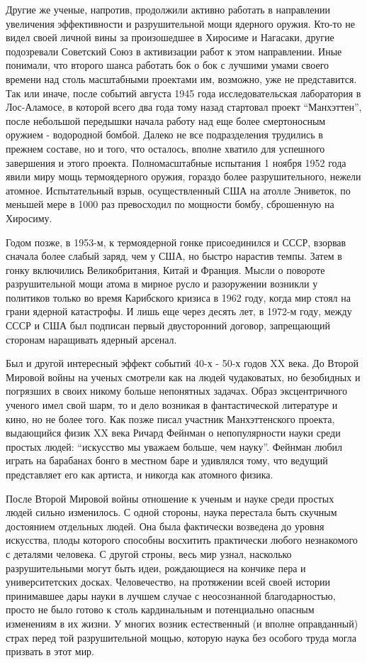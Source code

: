 Другие же ученые, напротив, продолжили активно работать в направлении увеличения эффективности и разрушительной мощи ядерного оружия.
Кто-то не видел своей личной вины за произошедшее в Хиросиме и Нагасаки, другие подозревали Советский Союз в активизации работ к этом направлении.
Иные понимали, что второго шанса работать бок о бок с лучшими умами своего времени над столь масштабными проектами им, возможно, уже не представится. 
Так или иначе, после событий августа 1945 года исследовательская лаборатория в Лос-Аламосе, в которой всего два года тому назад стартовал проект ``Манхэттен'', после небольшой передышки начала работу над еще более смертоносным оружием - водородной бомбой.
Далеко не все подразделения трудились в прежнем составе, но и того, что осталось, вполне хватило для успешного завершения и этого проекта. 
Полномасштабные испытания 1 ноября 1952 года явили миру мощь термоядерного оружия, гораздо более разрушительного, нежели атомное.
Испытательный взрыв, осуществленный США на атолле Эниветок, по меньшей мере в 1000 раз превосходил по мощности бомбу, сброшенную на Хиросиму.

Годом позже, в 1953-м, к термоядерной гонке присоединился и СССР, взорвав сначала более слабый заряд, чем у США, но быстро нарастив темпы. 
Затем в гонку включились Великобритания, Китай и Франция.
Мысли о повороте разрушительной мощи атома в мирное русло и разоружении возникли у политиков только во время Карибского кризиса в 1962 году, когда мир стоял на грани ядерной катастрофы. 
И лишь еще через десять лет, в 1972-м году, между СССР и США был подписан первый двусторонний договор, запрещающий сторонам наращивать ядерный арсенал.

Был и другой интересный эффект событий 40-х - 50-х годов XX века.
До Второй Мировой войны на ученых смотрели как на людей чудаковатых, но безобидных и погрязших в своих никому больше непонятных задачах. 
Образ эксцентричного ученого имел свой шарм, то и дело возникая в фантастической литературе и кино, но не более того.
Как позже писал участник Манхэттенского проекта, выдающийся физик XX века Ричард Фейнман о непопулярности науки среди простых людей: ``искусство мы уважаем больше, чем науку''.
Фейнман любил играть на барабанах бонго в местном баре и удивлялся тому, что ведущий представляет его как артиста, и никогда как атомного физика.

После Второй Мировой войны отношение к ученым и науке среди простых людей сильно изменилось.
С одной стороны, наука перестала быть скучным достоянием отдельных людей.
Она была фактически возведена до уровня искусства, плоды которого способны восхитить практически любого незнакомого с деталями человека.
С другой строны, весь мир узнал, насколько разрушительными могут быть идеи, рождающиеся на кончике пера и университетских досках.
Человечество, на протяжении всей своей истории принимавшее дары науки в лучшем случае с неосознанной благодарностью, просто не было готово к столь кардинальным и потенциально опасным изменениям в их жизни.
У многих возник естественный (и вполне оправданный) страх перед той разрушительной мощью, которую наука без особого труда могла призвать в этот мир. 

